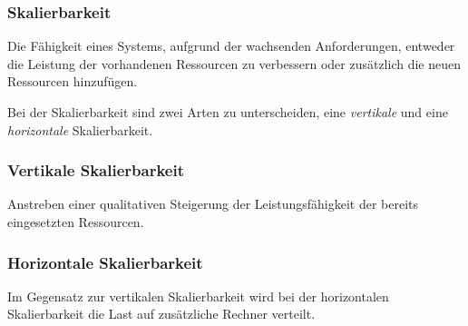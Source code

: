 \documentclass{beamer} %
\begin{document}
\begin{frame}
\frametitle{Skalierbarkeit}

Die Fähigkeit eines Systems, aufgrund der wachsenden Anforderungen, entweder die Leistung der vorhandenen Ressourcen zu verbessern oder zusätzlich die neuen Ressourcen hinzufügen.\newline\newline

Bei der Skalierbarkeit sind zwei Arten zu unterscheiden, eine \textit{vertikale} und eine \textit{horizontale} Skalierbarkeit.
\end{frame}


\begin{frame}
\frametitle{Vertikale Skalierbarkeit}

Anstreben einer qualitativen Steigerung der Leistungsfähigkeit der bereits eingesetzten Ressourcen.

\end{frame}

\begin{frame}
\frametitle{Horizontale Skalierbarkeit}

Im Gegensatz zur vertikalen Skalierbarkeit wird bei der horizontalen Skalierbarkeit die Last auf zusätzliche Rechner verteilt.

\end{frame}

%
%
%
\end{document}
